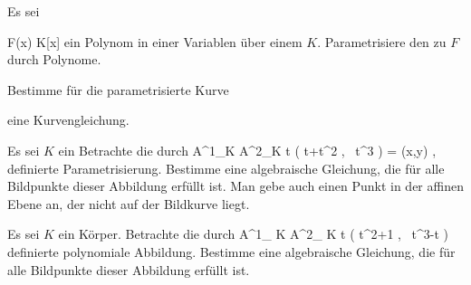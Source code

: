 \setcounter{section}{6}







{}
{





Es sei

\mavergleichskette
{\vergleichskette
{ F(x)
}
{ \in }{ K[x]
}
{  }{
}
{    }{
}
{   }{
}
}
{}{}{}
ein Polynom in einer Variablen über einem
$K$. Parametrisiere den
zu $F$ durch Polynome.





}
{} {}

{}
{





Bestimme für die parametrisierte Kurve

 {  }

eine Kurvengleichung.





}
{} {}

{}
{





Es sei $K$ ein
Betrachte die durch
\maabbeledisp {} { {\mathbb A}^{1}_{K}  } { {\mathbb A}^{2}_{K}
} { t } {  \left(  t+t^2   , \,   t^3                   \right) = (x,y)
} {,}
definierte Parametrisierung. Bestimme eine
 {} {}
algebraische Gleichung, die  für alle Bildpunkte dieser Abbildung erfüllt ist. Man gebe auch einen Punkt in der affinen Ebene an, der nicht auf der Bildkurve liegt.





}
{} {}

{}
{





Es sei $K$ ein Körper. Betrachte die durch
\maabbeledisp {} { {\mathbb A}^{1}_{ K } } { {\mathbb A}^{2}_{ K }
} { t } { \left(  t^2+1   , \,   t^3-t                   \right)
} {}
definierte polynomiale Abbildung. Bestimme eine
 {} {}
algebraische Gleichung, die für alle Bildpunkte dieser Abbildung erfüllt ist.





}
{} {}

